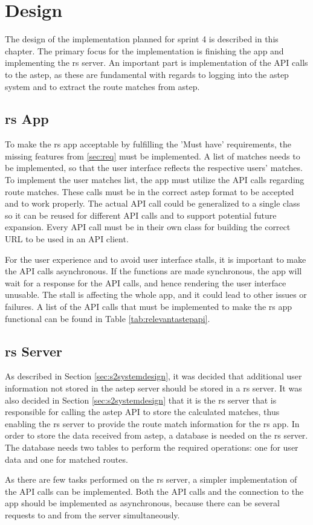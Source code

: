 \section{Design}
The design of the implementation planned for sprint 4 is described in this chapter.
The primary focus for the implementation is finishing the app and implementing the \gls{rs} server.
An important part is implementation of the API calls to the \gls{astep}, as these are fundamental with regards to logging into the \gls{astep} system and to extract the route matches from \gls{astep}.

\subsection{\gls{rs} App}
To make the \gls{rs} app acceptable by fulfilling the 'Must have' requirements, the missing features from \ref{sec:req} must be implemented.
A list of matches needs to be implemented, so that the user interface reflects the respective users' matches.
To implement the user matches list, the app must utilize the API calls regarding route matches.
These calls must be in the correct \gls{astep} format to be accepted and to work properly.
The actual API call could be generalized to a single class so it can be reused for different API calls and to support potential future expansion.
Every API call must be in their own class for building the correct URL to be used in an API client.

For the user experience and to avoid user interface stalls, it is important to make the API calls asynchronous. 
If the functions are made synchronous, the app will wait for a response for the API calls, and hence rendering the user interface unusable.
The stall is affecting the whole app, and it could lead to other issues or failures.
A list of the API calls that must be implemented to make the \gls{rs} app functional can be found in Table \ref{tab:relevantastepapi}.

\subsection{\gls{rs} Server}
As described in Section \ref{sec:s2systemdesign}, it was decided that additional user information not stored in the \gls{astep} server should be stored in a \gls{rs} server.
It was also decided in Section \ref{sec:s2systemdesign} that it is the \gls{rs} server that is responsible for calling the \gls{astep} API to store the calculated matches, thus enabling the \gls{rs} server to provide the route match information for the \gls{rs} app.
In order to store the data received from \gls{astep}, a database is needed on the \gls{rs} server.
The database needs two tables to perform the required operations: one for user data and one for matched routes.

As there are few tasks performed on the \gls{rs} server, a simpler implementation of the API calls can be implemented.
Both the API calls and the connection to the app should be implemented as asynchronous, because there can be several requests to and from the server simultaneously. 